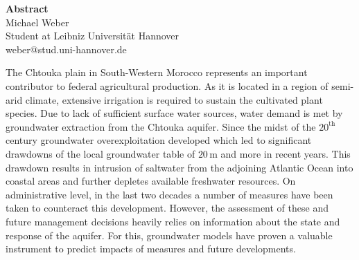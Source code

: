 \thispagestyle{plain}
\begin{center}
    \LARGE
    \textbf{Abstract}\\
    \vspace{1cm}
    \hspace{0pt}
    \large
    Michael Weber \\
    \vspace{0.5cm}
    \small
    Student at Leibniz Universität Hannover\\
    weber@stud.uni-hannover.de

    \vspace{0.7cm}
\end{center}

\normalsize
The Chtouka plain in South-Western Morocco represents an important contributor to federal agricultural production. 
As it is located in a region of semi-arid climate, extensive irrigation is required to sustain the cultivated plant species. 
Due to lack of sufficient surface water sources, water demand is met by groundwater extraction from the Chtouka aquifer. 
Since the midst of the $20^\textrm{th}$ century groundwater overexploitation developed which led to significant drawdowns of the local groundwater table of $20 \, \textrm{m}$ and more in recent years. 
This drawdown results in intrusion of saltwater from the adjoining Atlantic Ocean into coastal areas and further depletes available freshwater resources. 
On administrative level, in the last two decades a number of measures have been taken to counteract this development. 
However, the assessment of these and future management decisions heavily relies on information about the state and response of the aquifer. 
For this, groundwater models have proven a valuable instrument to predict impacts of measures and future developments.

